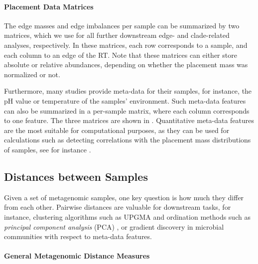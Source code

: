 \paragraph{Placement Data Matrices}
\label{ch:Foundations:sec:PhylogeneticPlacement:sub:PlacementProcessing:par:PlacementDataMatrices}

The edge masses and edge imbalances per sample can be summarized by two matrices,
which we use for all further downstream edge- and clade-related analyses, respectively.
In these matrices, each row corresponds to a sample, and each column to an edge of the \ac{RT}.
Note that these matrices can either store absolute or relative abundances,
depending on whether the placement mass was normalized or not.

Furthermore, many studies provide meta-data for their samples,
for instance, the pH value or temperature of the samples' environment.
Such meta-data features can also be summarized in a per-sample matrix, where each column corresponds to one feature.
The three matrices are shown in .
Quantitative meta-data features are the most suitable for computational purposes,
as they can be used for calculations such as detecting correlations with the placement mass distributions of samples,
see for instance .


\subsection{Distances between Samples}
\label{ch:Foundations:sec:PhylogeneticPlacement:sub:Distances}

Given a set of metagenomic samples, one key question is how much they differ from each other.
Pairwise distances are valuable for downstream tasks, for instance,
clustering algorithms such as \mbox{UPGMA} \cite{Michener1957,Sokal1958,Legendre1998} and
ordination methods such as \emph{principal component analysis} (PCA) \cite{Pearson1901,Jolliffe2002},
or gradient discovery in microbial communities with respect to meta-data features.

\paragraph{General Metagenomic Distance Measures}
\label{ch:Foundations:sec:PhylogeneticPlacement:sub:Distances:par:GeneralMeasures}

